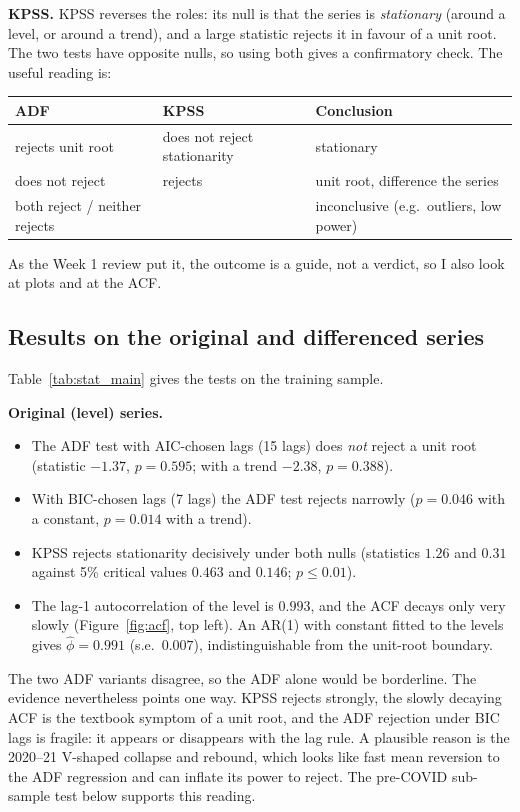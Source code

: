 \documentclass[11pt,a4paper]{article}
\begin{document}
\textbf{KPSS.} KPSS reverses the roles: its null is that the series is \emph{stationary} (around a level, or around a trend), and a large statistic rejects it in favour of a unit root. The two tests have opposite nulls, so using both gives a confirmatory check. The useful reading is:
\begin{center}\small
\begin{tabular}{lll}\toprule
ADF & KPSS & Conclusion\\\midrule
rejects unit root & does not reject stationarity & stationary\\
does not reject & rejects & unit root, difference the series\\
both reject / neither rejects & & inconclusive (e.g.\ outliers, low power)\\\bottomrule
\end{tabular}
\end{center}
As the Week 1 review put it, the outcome is a guide, not a verdict, so I also look at plots and at the ACF.

\subsection{Results on the original and differenced series}
Table~\ref{tab:stat_main} gives the tests on the training sample.


\textbf{Original (level) series.}
\begin{itemize}
\item The ADF test with AIC-chosen lags (15 lags) does \emph{not} reject a unit root (statistic $-1.37$, $p=0.595$; with a trend $-2.38$, $p=0.388$).
\item With BIC-chosen lags (7 lags) the ADF test rejects narrowly ($p=0.046$ with a constant, $p=0.014$ with a trend).
\item KPSS rejects stationarity decisively under both nulls (statistics $1.26$ and $0.31$ against 5\% critical values $0.463$ and $0.146$; $p\le 0.01$).
\item The lag-1 autocorrelation of the level is $0.993$, and the ACF decays only very slowly (Figure~\ref{fig:acf}, top left). An AR(1) with constant fitted to the levels gives $\hat\phi=0.991$ (s.e.\ $0.007$), indistinguishable from the unit-root boundary.
\end{itemize}
The two ADF variants disagree, so the ADF alone would be borderline. The evidence nevertheless points one way. KPSS rejects strongly, the slowly decaying ACF is the textbook symptom of a unit root, and the ADF rejection under BIC lags is fragile: it appears or disappears with the lag rule. A plausible reason is the 2020--21 V-shaped collapse and rebound, which looks like fast mean reversion to the ADF regression and can inflate its power to reject. The pre-COVID sub-sample test below supports this reading.
\end{document}
